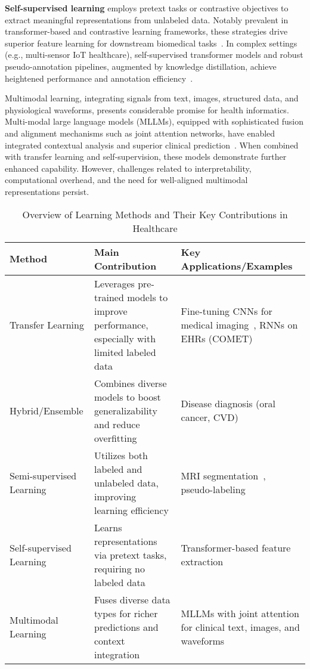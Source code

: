 \documentclass[sigconf]{acmart}
\begin{document}
\textbf{Self-supervised learning} employs pretext tasks or contrastive objectives to extract meaningful representations from unlabeled data. Notably prevalent in transformer-based and contrastive learning frameworks, these strategies drive superior feature learning for downstream biomedical tasks~\cite{ref41, ref55, ref64, ref76, ref106}. In complex settings (e.g., multi-sensor IoT healthcare), self-supervised transformer models and robust pseudo-annotation pipelines, augmented by knowledge distillation, achieve heightened performance and annotation efficiency~\cite{ref49, ref51, ref54, ref65, ref76, ref77, ref90, ref106}.

Multimodal learning, integrating signals from text, images, structured data, and physiological waveforms, presents considerable promise for health informatics. Multi-modal large language models (MLLMs), equipped with sophisticated fusion and alignment mechanisms such as joint attention networks, have enabled integrated contextual analysis and superior clinical prediction~\cite{ref31, ref43, ref49, ref50, ref54, ref61, ref65, ref76, ref88, ref90, ref106}. When combined with transfer learning and self-supervision, these models demonstrate further enhanced capability. However, challenges related to interpretability, computational overhead, and the need for well-aligned multimodal representations persist.

\begin{table*}[htbp]
\centering
\caption{Overview of Learning Methods and Their Key Contributions in Healthcare}
\label{tab:learning_methods}
\begin{adjustbox}{max width=\textwidth}
\begin{tabular}{lll}
\toprule
\textbf{Method}      & \textbf{Main Contribution}                                        & \textbf{Key Applications/Examples} \\
\midrule
Transfer Learning    & Leverages pre-trained models to improve performance, especially with limited labeled data & Fine-tuning CNNs for medical imaging~\cite{ref31, ref54, ref90}, RNNs on EHRs (COMET)~\cite{ref49} \\
Hybrid/Ensemble      & Combines diverse models to boost generalizability and reduce overfitting                   & Disease diagnosis (oral cancer, CVD)~\cite{ref53, ref71, ref90} \\
Semi-supervised Learning & Utilizes both labeled and unlabeled data, improving learning efficiency                  & MRI segmentation~\cite{ref61, ref77}, pseudo-labeling~\cite{ref76} \\
Self-supervised Learning & Learns representations via pretext tasks, requiring no labeled data                     & Transformer-based feature extraction~\cite{ref41, ref55, ref106} \\
Multimodal Learning  & Fuses diverse data types for richer predictions and context integration                     & MLLMs with joint attention for clinical text, images, and waveforms~\cite{ref31, ref49, ref76, ref106} \\
\bottomrule
\end{tabular}
\end{adjustbox}
\end{table*}
\end{document}
